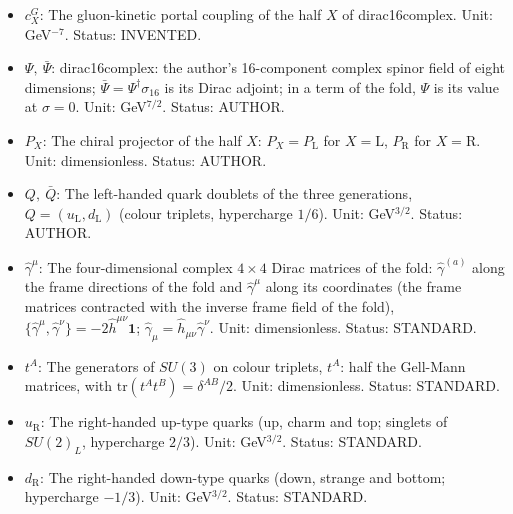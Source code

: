 \documentclass[
  10pt,
]{article}
\begin{document}
\begin{itemize}
  \(X \in \{\mathrm{L}, \mathrm{R}\}\) (left-handed or right-handed
  half); a sum over \(X\) runs over both. Status: STANDARD.
\item
  \(c^{G}_X\): The gluon-kinetic portal coupling of the half \(X\) of
  dirac16complex. Unit: GeV\(^{-7}\). Status: INVENTED.
\item
  \(\Psi,\ \bar\Psi\): dirac16complex: the author's 16-component complex
  spinor field of eight dimensions;
  \(\bar\Psi = \Psi^\dagger\sigma_{16}\) is its Dirac adjoint; in a term
  of the fold, \(\Psi\) is its value at \(\sigma = 0\). Unit:
  GeV\(^{7/2}\). Status: AUTHOR.
\item
  \(P_X\): The chiral projector of the half \(X\):
  \(P_X = P_{\mathrm{L}}\) for \(X = \mathrm{L}\), \(P_{\mathrm{R}}\)
  for \(X = \mathrm{R}\). Unit: dimensionless. Status: AUTHOR.
\item
  \(Q,\ \bar Q\): The left-handed quark doublets of the three
  generations, \(Q = (u_{\mathrm{L}}, d_{\mathrm{L}})\) (colour
  triplets, hypercharge \(1/6\)). Unit: GeV\(^{3/2}\). Status: AUTHOR.
\item
  \(\hat\gamma^\mu\): The four-dimensional complex \(4 \times 4\) Dirac
  matrices of the fold: \(\hat\gamma^{(a)}\) along the frame directions
  of the fold and \(\hat\gamma^\mu\) along its coordinates (the frame
  matrices contracted with the inverse frame field of the fold),
  \(\{\hat\gamma^\mu, \hat\gamma^\nu\} = -2\hat h^{\mu\nu}\mathbf{1}\);
  \(\hat\gamma_\mu = \hat h_{\mu\nu}\hat\gamma^\nu\). Unit:
  dimensionless. Status: STANDARD.
\item
  \(t^A\): The generators of \(SU(3)\) on colour triplets, \(t^A\): half
  the Gell-Mann matrices, with \(\mathrm{tr}(t^At^B) = \delta^{AB}/2\).
  Unit: dimensionless. Status: STANDARD.
\item
  \(u_{\mathrm{R}}\): The right-handed up-type quarks (up, charm and
  top; singlets of \(SU(2)_L\), hypercharge \(2/3\)). Unit:
  GeV\(^{3/2}\). Status: STANDARD.
\item
  \(d_{\mathrm{R}}\): The right-handed down-type quarks (down, strange
  and bottom; hypercharge \(-1/3\)). Unit: GeV\(^{3/2}\). Status:
  STANDARD.
\end{itemize}
\end{document}
